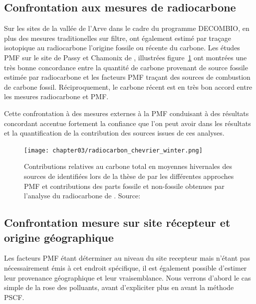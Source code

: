\subsection{Confrontation aux mesures de radiocarbone }%
\label{sub:14c}

Sur les sites de la vallée de l'Arve dans le cadre du programme DECOMBIO, en plus des mesures
traditionelles sur filtre, \textcite{bonvalotEstimating2016} ont également estimé par
traçage isotopique au radiocarbone  l'origine fossile ou récente du carbone.
Les études PMF sur le site de Passy et Chamonix de \textcite{chevrierChauffage2016},
illustrées figure~\ref{fig:chapter03/radiocarbon_chevrier_winter} ont
montrées une très bonne concordance entre la quantité de carbone provenant de source
fossile estimée par radiocarbone et les facteurs PMF traçant des sources de combustion de
carbone fossil. Réciproquement, le carbone récent est en très bon accord entre les mesures
radiocarbone et PMF.

Cette confrontation à des mesures externes à la PMF conduisant à des résultats concordant
accentue fortement la confiance que l'on peut avoir dans les résultats et la
quantification de la contribution des sources issues de ces analyses.

\begin{figure}[ht]
    \centering
    \texttt{[image: chapter03/radiocarbon\_chevrier\_winter.png]}
    \caption{Contributions relatives au carbone total en moyennes hivernales des sources
        de \PMdix identifiées lors de la thèse de \textcite{chevrierChauffage2016} par les
        différentes approches PMF et contributions des parts fossile et non-fossile
        obtenues par l’analyse du radiocarbone de \textcite{bonvalotEstimating2016}.
    Source: \textcite[figure 75]{chevrierChauffage2016}}%
    \label{fig:chapter03/radiocarbon_chevrier_winter}
\end{figure}

\subsection{Confrontation mesure sur site récepteur et origine géographique}%
\label{sub:confrontation_mesure_sur_site_recepteur_et_origine_geographique}

Les facteurs PMF étant déterminer au niveau du site recepteur mais n'étant pas
nécessairement émis à cet endroit spécifique, il est également possible d'estimer leur
provenance géographique et leur vraisemblance. Nous verrons d'abord le cas simple de la
rose des polluants, avant d'expliciter plus en avant la méthode PSCF.

